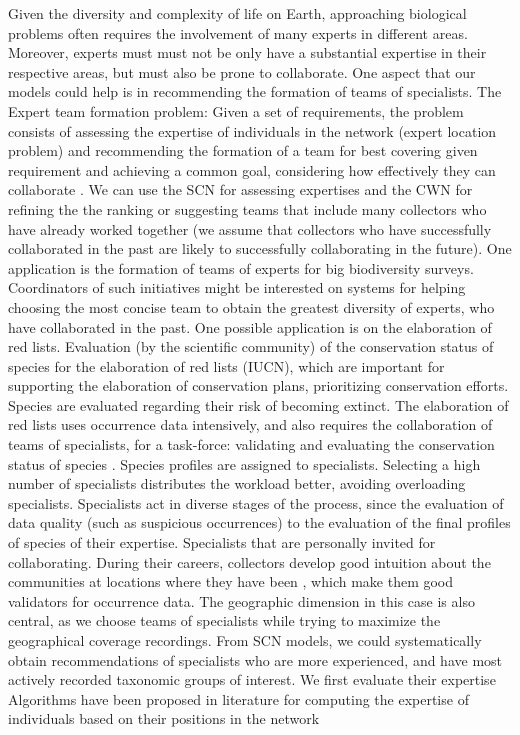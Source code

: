 Given the diversity and complexity of life on Earth, approaching biological problems often requires the involvement of many experts in different areas.
Moreover, experts must must not be only have a substantial expertise in their respective areas, but must also be prone to collaborate.
One aspect that our models could help is in recommending the formation of teams of specialists.
The Expert team formation problem:
Given a set of requirements, the problem consists of assessing the expertise of individuals in the network (expert location problem) and recommending the formation of a team for best covering given requirement and achieving a common goal, considering how effectively they can collaborate \cite{Lappas2001}.
We can use the SCN for assessing expertises and the CWN for refining the the ranking or suggesting teams that include many collectors who have already worked together (we assume that collectors who have successfully collaborated in the past are likely to successfully collaborating in the future).
%
One application is the formation of teams of experts for big biodiversity surveys.
Coordinators of such initiatives might be interested on systems for helping choosing the most concise team to obtain the greatest diversity of experts, who have collaborated in the past.
%
One possible application is on the elaboration of red lists.
Evaluation (by the scientific community) of the conservation status of species for the elaboration of red lists (IUCN), which are important for supporting the elaboration of conservation plans, prioritizing conservation efforts.
Species are evaluated regarding their risk of becoming extinct.
The elaboration of red lists uses occurrence data intensively, and also requires the collaboration of teams of specialists, for a task-force: validating and evaluating the conservation status of species \cite{Martinelli2013}.
Species profiles are assigned to specialists.
Selecting a high number of specialists distributes the workload better, avoiding overloading specialists.
Specialists act in diverse stages of the process, since the evaluation of data quality (such as suspicious occurrences) to the evaluation of the final profiles of species of their expertise.
Specialists that are personally invited for collaborating.
During their careers, collectors develop good intuition about the communities at locations where they have been \cite{Noss1996}, which make them good validators for occurrence data.
The geographic dimension in this case is also central, as we choose teams of specialists while trying to maximize the geographical coverage recordings.
From SCN models, we could systematically obtain recommendations of specialists who are more experienced, and have most actively recorded taxonomic groups of interest.
We first evaluate their expertise
Algorithms have been proposed in literature for computing the expertise of individuals based on their positions in the network \cite{Lappas2011}

